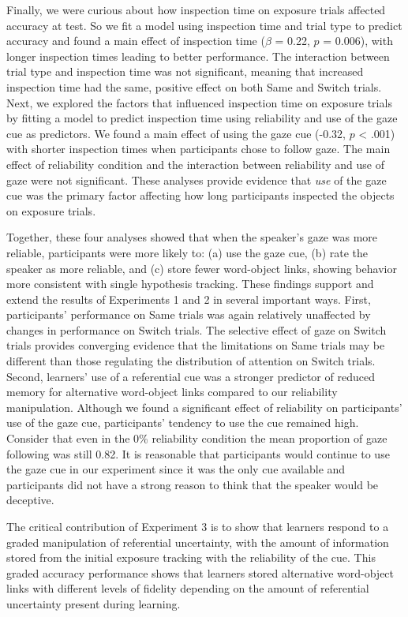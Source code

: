 \documentclass[authoryear, review]{elsarticle}
\begin{document}
Finally, we were curious about how inspection time on exposure trials
affected accuracy at test. So we fit a model using inspection time and
trial type to predict accuracy and found a main effect of inspection
time (\(\beta\) = 0.22, \(p\) = 0.006), with longer inspection times
leading to better performance. The interaction between trial type and
inspection time was not significant, meaning that increased inspection
time had the same, positive effect on both Same and Switch trials. Next,
we explored the factors that influenced inspection time on exposure
trials by fitting a model to predict inspection time using reliability
and use of the gaze cue as predictors. We found a main effect of using
the gaze cue (-0.32, \(p\) \textless{} .001) with shorter inspection
times when participants chose to follow gaze. The main effect of
reliability condition and the interaction between reliability and use of
gaze were not significant. These analyses provide evidence that
\emph{use} of the gaze cue was the primary factor affecting how long
participants inspected the objects on exposure trials.

Together, these four analyses showed that when the speaker's gaze was
more reliable, participants were more likely to: (a) use the gaze cue,
(b) rate the speaker as more reliable, and (c) store fewer word-object
links, showing behavior more consistent with single hypothesis tracking.
These findings support and extend the results of Experiments 1 and 2 in
several important ways. First, participants' performance on Same trials
was again relatively unaffected by changes in performance on Switch
trials. The selective effect of gaze on Switch trials provides
converging evidence that the limitations on Same trials may be different
than those regulating the distribution of attention on Switch trials.
Second, learners' use of a referential cue was a stronger predictor of
reduced memory for alternative word-object links compared to our
reliability manipulation. Although we found a significant effect of
reliability on participants' use of the gaze cue, participants' tendency
to use the cue remained high. Consider that even in the 0\% reliability
condition the mean proportion of gaze following was still 0.82. It is
reasonable that participants would continue to use the gaze cue in our
experiment since it was the only cue available and participants did not
have a strong reason to think that the speaker would be deceptive.

The critical contribution of Experiment 3 is to show that learners
respond to a graded manipulation of referential uncertainty, with the
amount of information stored from the initial exposure tracking with the
reliability of the cue. This graded accuracy performance shows that
learners stored alternative word-object links with different levels of
fidelity depending on the amount of referential uncertainty present
during learning.
\end{document}
